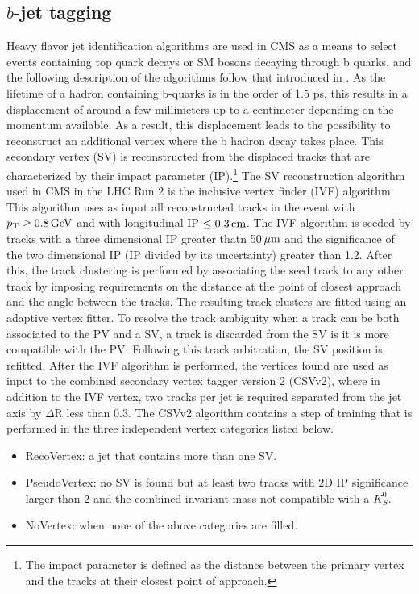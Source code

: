 \subsection*{$b$-jet tagging}\label{sec:objectsBJets}
\noindent\justify
Heavy flavor jet identification algorithms are used in CMS as a means to select events containing top quark decays or SM bosons decaying through b quarks, and the following description of the algorithms follow that introduced in \cite{Sirunyan:2017ezt}. 
As the lifetime of a hadron containing b-quarks is in the order of 1.5 ps, this results in a displacement of around a few millimeters up to a centimeter depending on the momentum available. 
As a result, this displacement leads to the possibility to reconstruct an additional vertex where the b hadron decay takes place. 
This secondary vertex (SV) is reconstructed from the displaced tracks that are characterized by their impact parameter (IP).\footnote{The impact parameter is defined as the distance between the primary vertex and the tracks at their closest point of approach.}
The SV reconstruction algorithm used in CMS in the LHC Run 2 is the inclusive vertex finder (IVF) algorithm.
This algorithm uses as input all reconstructed tracks in the event with $p_{\mathrm{T}}\geq0.8\,\text{Ge\hspace{-.08em}V}$ and with longitudinal IP $\leq0.3\,\text{cm}$. 
The IVF algorithm is seeded by tracks with a three dimensional IP greater thatn 50$\,\mu\text{m}$ and the significance of the two dimensional IP (IP divided by its uncertainty) greater than 1.2. 
After this, the track clustering is performed by associating the seed track to any other track by imposing requirements on the distance at the point of closest approach and the angle between the tracks. 
The resulting track clusters are fitted using an adaptive vertex fitter. 
To resolve the track ambiguity when a track can be both associated to the PV and a SV, a track is discarded from the SV is it is more compatible with the PV. 
Following this track arbitration, the SV position is refitted. 
After the IVF algorithm is performed, the vertices found are used as input to the combined secondary vertex tagger version 2 (CSVv2), where in addition to the IVF vertex, two tracks per jet is required separated from the jet axis by $\Delta$R less than 0.3. 
The CSVv2 algorithm contains a step of training that is performed in the three independent vertex categories listed below.
\begin{itemize}
\item RecoVertex: a jet that contains more than one SV.
\item PseudoVertex: no SV is found but at least two tracks with 2D IP significance larger than 2 and the combined invariant mass not compatible with a $K_{S}^{0}$. 
\item NoVertex: when none of the above categories are filled. 
\end{itemize}
